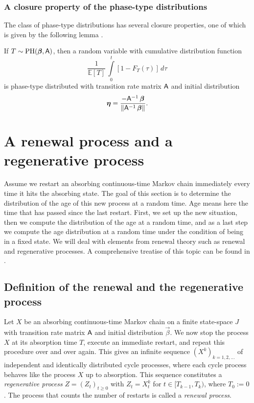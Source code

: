 \documentclass[smallextended]{svjour3}
\newcommand{\E}{\mathbb{E}}
\newcommand{\intl}{\int\limits}
\begin{document}
\subsubsection{A closure property of the phase-type distributions}
The class of phase-type distributions has several closure properties, one of which is given by the following lemma \citep{Neuts1981}.
\begin{lemma}\label{lem:closure}
    If $T\sim\operatorname{PH}(\vec{\beta},\tens{A})$, then a random variable with cumulative distribution function
    \begin{equation*}
        \frac{1}{\E[T]}\,\intl_0^t \left[1-F_T(\tau)\right]\,d\tau
    \end{equation*}
    is phase-type distributed with transition rate matrix $\mathsf{A}$ and initial distribution
    \[
        \vec{\eta}=\frac{-\tens{A}^{-1}\,\vec{\beta}}{\|\tens{A}^{-1}\,\vec{\beta}\|}.
    \]
\end{lemma}

\section{A renewal process and a regenerative process\label{sec:renewal}}

Assume we restart an absorbing continuous-time Markov chain immediately every time it hits the absorbing state.
The goal of this section is to determine the distribution of the age of this new process at a random time.
Age means here the time that has passed since the last restart.
First, we set up the new situation, then we compute the distribution of the age at a random time, and as a last step we compute the age distribution at a random time under the condition of being in a fixed state.
We will deal with elements from renewal theory such as renewal and regenerative processes.
A comprehensive treatise of this topic can be found in \citet{Asmussen2003}.

\subsection{Definition of the renewal and the regenerative process}

Let $X$ be an absorbing continuous-time Markov chain on a finite state-space $J$ with transition rate matrix $\mathsf{A}$ and initial distribution $\vec{\beta}$.
We now stop the process $X$ at its absorption time $T$, execute an immediate restart, and repeat this procedure over and over again.
This gives an infinite sequence $(X^k)_{k=1,2,\ldots}$ of independent and identically distributed cycle processes, where each cycle process behaves like the process $X$ up to absorption.
This sequence constitutes a \emph{regenerative process} $Z=(Z_t)_{t\geq0}$ with $Z_t=X^k_t$ for $t\in[T_{k-1},T_k)$, where $T_0:=0$.
The process that counts the number of restarts is called a \emph{renewal process}.
\end{document}
